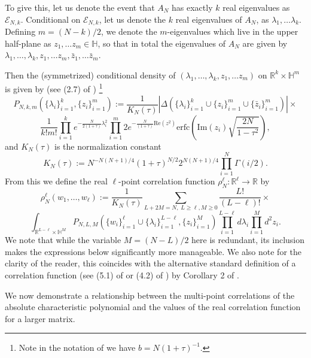\documentclass[12pt]{article}
\newcommand{\R}{\mathbb{R}}
\numberwithin{info}{section}
\numberwithin{equation}{section}
\renewcommand{\[}{\begin{equation}}
\renewcommand{\]}{\end{equation}}
\newcommand{\lam}{\lambda}
\renewcommand{\cal}{\mathcal}
\newcommand{\sq}{\sqrt}
\newcommand{\<}{\langle}
\renewcommand{\>}{\rangle}
\renewcommand{\sq}{\sqrt}
\renewcommand{\Im}{\mathrm{Im}}
\renewcommand{\Re}{\mathrm{Re}}
\renewcommand{\Im}{\mathrm{Im}}
\renewcommand{\Re}{\mathrm{Re}}
\newcommand{\erfc}{\mathrm{erfc}}
\begin{document}
	To give this, let us denote the event that $A_N$ has exactly $k$ real eigenvalues as $\cal{E}_{N,k}$. Conditional on $\cal{E}_{N,k}$, let us denote the $k$ real eigenvalues of $A_N$, as $\lam_1,\dots \lam_k$. Defining $m=(N-k)/2$, we denote the $m$-eigenvalues which live in the upper half-plane as $z_1,\dots z_{m}\in \mathbb{H}$, so that in total the eigenvalues of $A_N$ are given by $\lam_1,\dots,\lam_k,z_1,\dots z_m, \bar{z}_1,\dots \bar{z}_m$. 
	
	Then the (symmetrized) conditional density of $(\lam_1,\dots,\lam_k,z_1,\dots z_m)$ on $\R^k\times \mathbb{H}^{m}$ is given by (see (2.7) of \cite{forrester-elliptic})
	\footnote{Note in the notation of \cite{forrester-elliptic} we have $b=N(1+\tau)^{-1}$.}
	\[P_{N,k,m}(\{\lam_i\}_{i=1}^k,\{z_i\}_{i=1}^{m}):=\frac{1}{K_N(\tau)}|\Delta(\{\lam_i\}_{i=1}^k\cup\{z_i\}_{i=1}^m\cup \{\bar{z}_i\}_{i=1}^m)|\times\]\[\frac{1}{k!m!}\prod_{i=1}^ke^{-\frac{N}{2(1+\tau)}\lam_i^2}\prod_{i=1}^{m}2e^{-\frac{N}{(1+\tau)}\Re(z^2)}\erfc \left(\Im(z_i)\sq{\frac{2N}{1-\tau^2}} \right),\]
	and $K_N(\tau)$ is the normalization constant
	\[K_N(\tau):=N^{-N(N+1)/4}(1+\tau)^{N/2}2^{N(N+1)/4}\prod_{i=1}^{N}\Gamma(i/2).\]
	From this we define the real $\ell$-point correlation function $\rho^{\ell}_N:\R^\ell\to \R$ by
	\[\rho^{\ell}_N(w_1,\dots, w_\ell):=\frac{1}{K_N(\tau)}\sum_{L+2M=N,\; L\ge \ell,M\ge 0}\frac{L!}{(L-\ell)!}\times \]\[\int_{\R^{L-\ell}\times \mathbb{H}^{M}}P_{N,L,M}(\{w_i\}_{i=1}^{\ell}\cup\{\lam_i\}_{i=1}^{L-\ell}, \{z_i\}_{i=1}^{M})\prod_{i=1}^{L-\ell}d\lam_i\prod_{i=1}^{M}d^2z_i.\label{eqn:correlation density expression}\]
	We note that while the variable $M=(N-L)/2$ here is redundant, its inclusion makes the expressions below significantly more manageable. We also note for the clarity of the reader, this coincides with the alternative standard definition of a correlation function (see (5.1) of \cite{borodin-elliptic} or (4.2) of \cite{forrester-elliptic}) by Corollary 2 of \cite{borodin-elliptic}.
	
	We now demonstrate a relationship between the multi-point correlations of the absolute characteristic polynomial and the values of the real correlation function for a larger matrix.
	
\end{document}
